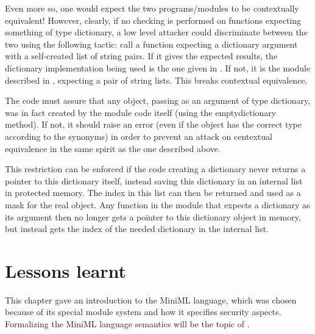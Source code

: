 \documentclass[10pt,a4paper,master=cws, masteroption=ai,english,inputenc=utf8]{kulemt}
\begin{document}
Even more so, one would expect the two programs/modules to be contextually equivalent! However, clearly, if no checking is performed on functions expecting something of type dictionary, a low level attacker could discriminate between the two using the following tactic: call a function expecting a dictionary argument with a self-created list of string pairs. If it gives the expected results, the dictionary implementation being used is the one given in . If not, it is the module described in , expecting a pair of string lists. This breaks contextual equivalence.

The code must assure that any object, passing as an argument of type dictionary, was in fact created by the module code itself (using the emptydictionary method). If not, it should raise an error (even if the object has the correct type according to the synonyms) in order to prevent an attack on centextual equivalence in the same spirit as the one described above.

This restriction can be enforced if the code creating a dictionary never returns a pointer to this dictionary itself, instead saving this dictionary in an internal list in protected memory. The index in this list can then be returned and used as a mask for the real object. Any function in the module that expects a dictionary as its argument then no longer gets a pointer to this dictionary object in memory, but instead gets the index of the needed dictionary in the internal list.


\section{Lessons learnt}

This chapter gave an introduction to the \mbox{MiniML} language, which was chosen because of its special module system and how it specifies security aspects. Formalizing the \mbox{MiniML} language semantics will be the topic of \label{chapter:formalspecification}.
\end{document}
